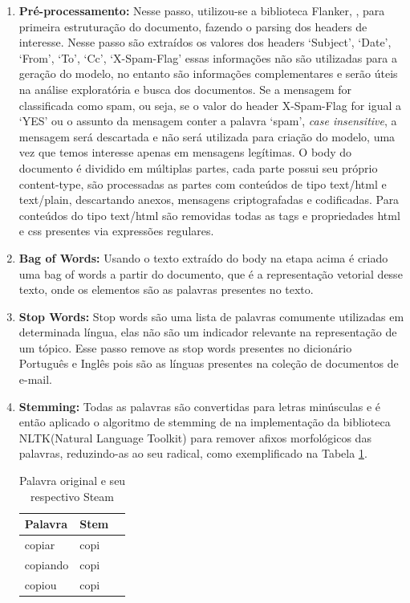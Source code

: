 \documentclass[12pt,a4paper]{article}
\begin{document}
\begin{enumerate}
\item \textbf{Pré-processamento:} Nesse passo, utilizou-se a biblioteca Flanker, , para primeira estruturação do documento, fazendo o parsing dos headers de interesse. Nesse passo são extraídos os valores dos headers ‘Subject’, ‘Date’, ‘From’, ‘To’, ‘Cc’, ‘X-Spam-Flag’ essas informações não são utilizadas para a geração do modelo,
 no entanto são informações complementares e serão úteis na análise exploratória e busca dos documentos. Se a mensagem for classificada como spam, ou seja, 
 se o valor do header X-Spam-Flag for igual a ‘YES’ ou o assunto da mensagem conter a palavra ‘spam’, \textit{case insensitive}, a mensagem será descartada e não será utilizada para criação do modelo,
 uma vez que temos interesse apenas em mensagens legítimas. O body do documento é dividido em múltiplas partes, cada parte possui seu próprio content-type,
 são processadas as partes com conteúdos de tipo text/html e text/plain, descartando anexos, mensagens criptografadas e codificadas. 
 Para conteúdos do tipo text/html são removidas todas as tags e propriedades html e css presentes via expressões regulares.
\item \textbf{Bag of Words:} Usando o texto extraído do body na etapa acima é criado uma bag of words a partir do documento, que é a representação vetorial desse texto,
 onde os elementos são as palavras presentes no texto.
\item \textbf{Stop Words:} Stop words são uma lista de palavras comumente utilizadas em determinada língua, elas não são um indicador relevante na representação de um tópico.
 Esse passo remove as stop words presentes no dicionário Português e Inglês pois são as línguas presentes na coleção de documentos de e-mail.
\item \textbf{Stemming:} Todas as palavras são convertidas para letras minúsculas e é então aplicado o algoritmo de stemming de 
 na implementação da biblioteca NLTK(Natural Language Toolkit)  para remover afixos morfológicos das palavras, reduzindo-as ao seu radical, como exemplificado na Tabela \ref{tab-stem}.


\begin{table}[h]
  \centering
  \begin{tabular}{l l l}
  Palavra		&Stem &\\
  \hline
  copiar		&copi &\\
  copiando		&copi &\\
  copiou		&copi &\\
  \hline
  \end{tabular}
  \caption{Palavra original e seu respectivo Steam}
  \label{tab-stem}
\end{table}


\end{enumerate}
\end{document}
